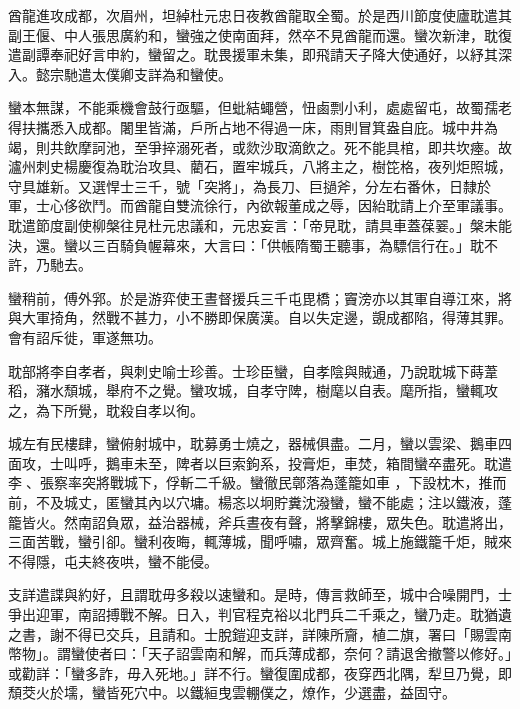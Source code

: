 \begin{pinyinscope}
 酋龍進攻成都，次眉州，坦綽杜元忠日夜教酋龍取全蜀。於是西川節度使廬耽遣其副王偃、中人張思廣約和，蠻強之使南面拜，然卒不見酋龍而還。蠻次新津，耽復遣副譚奉祀好言申約，蠻留之。耽畏援軍未集，即飛請天子降大使通好，以紓其深入。懿宗馳遣太僕卿支詳為和蠻使。



 蠻本無謀，不能乘機會鼓行亟驅，但蚍結蠅營，忸鹵剽小利，處處留屯，故蜀孺老得扶攜悉入成都。闍里皆滿，戶所占地不得過一床，雨則冒箕盎自庇。城中井為竭，則共飲摩訶池，至爭捽溺死者，或欻沙取滴飲之。死不能具棺，即共坎瘞。故瀘州刺史楊慶復為耽治攻具、藺石，置牢城兵，八將主之，樹笓格，夜列炬照城，守具雄新。又選悍士三千，號「突將」，為長刀、巨撾斧，分左右番休，日隸於軍，士心侈欲鬥。而酋龍自雙流徐行，內欲報董成之辱，因紿耽請上介至軍議事。耽遣節度副使柳槃往見杜元忠議和，元忠妄言：「帝見耽，請具車蓋葆翣。」槃未能決，還。蠻以三百騎負幄幕來，大言曰：「供帳隋蜀王聽事，為驃信行在。」耽不許，乃馳去。



 蠻稍前，傅外郛。於是游弈使王晝督援兵三千屯毘橋；竇滂亦以其軍自導江來，將與大軍掎角，然戰不甚力，小不勝即保廣漢。自以失定邊，覬成都陷，得薄其罪。會有詔斥徙，軍遂無功。



 耽部將李自孝者，與刺史喻士珍善。士珍臣蠻，自孝陰與賊通，乃說耽城下蒔葦稻，瀦水頹城，舉府不之覺。蠻攻城，自孝守陴，樹麾以自表。麾所指，蠻輒攻之，為下所覺，耽殺自孝以徇。


城左有民樓肆，蠻俯射城中，耽募勇士燒之，器械俱盡。二月，蠻以雲梁、鵝車四面攻，士叫呼，鵝車未至，陴者以巨索鉤系，投膏炬，車焚，箱間蠻卒盡死。耽遣李、張察率突將戰城下，俘斬二千級。蠻徹民鄣落為蓬籠如車
 ，下設枕木，推而前，不及城丈，匿蠻其內以穴墉。楊忞以坰貯糞沈潑蠻，蠻不能處；注以鐵液，蓬籠皆火。然南詔負眾，益治器械，斧兵晝夜有聲，將擊錦樓，眾失色。耽遣將出，三面苦戰，蠻引卻。蠻利夜晦，輒薄城，聞呼嘯，眾齊奮。城上施鐵籠千炬，賊來不得隱，屯夫終夜哄，蠻不能侵。



 支詳遣諜與約好，且謂耽毋多殺以速蠻和。是時，傳言救師至，城中合噪開門，士爭出迎軍，南詔搏戰不解。日入，判官程克裕以北門兵二千乘之，蠻乃走。耽猶遺之書，謝不得已交兵，且請和。士脫鎧迎支詳，詳陳所齎，植二旗，署曰「賜雲南幣物」。謂蠻使者曰：「天子詔雲南和解，而兵薄成都，奈何？請退舍撤警以修好。」或勸詳：「蠻多詐，毋入死地。」詳不行。蠻復圍成都，夜穿西北隅，犁旦乃覺，即頹茭火於壖，蠻皆死穴中。以鐵絙曳雲輣僕之，燎作，少選盡，益固守。




\end{pinyinscope}
